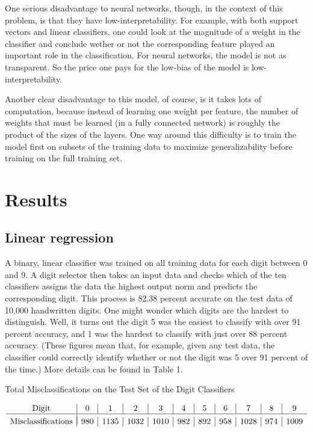 \documentclass{article}
\begin{document}
One serious disadvantage to neural networks, though, in the context of this problem, is that they have low-interpretability. For example, with both support vectors and linear classifiers, one could look at the magnitude of a weight in the classifier and conclude wether or not the corresponding feature played an important role in the classification. For neural networks, the model is not as transparent. So the price one pays for the low-bias of the model is low-interpretability. 

Another clear disadvantage to this model, of course, is it takes lots of computation, because instead of learning one weight per feature, the number of weights that must be learned (in a fully connected network) is roughly the product of the sizes of the layers. One way around this difficulty is to train the model first on subsets of the training data to maximize generalizability before training on the full training set.

\section{Results}

\subsection{Linear regression}

A binary, linear classifier was trained on all training data for each digit between 0 and 9. A digit selector then takes an input data and checks which of the ten classifiers assigns the data the highest output norm and predicts the corresponding digit. This process is 82.38 percent accurate on the test data of 10,000 handwritten digits. One might wonder which digits are the hardest to distinguish. Well, it turns out the digit 5 was the easiest to classify with over 91 percent accuracy, and 1 was the hardest to classify with just over 88 percent accuracy. (These figures mean that, for example, given any test data, the classifier could correctly identify whether or not the digit was 5 over 91 percent of the time.) More details can be found in Table 1. \begin{table}
  \caption{Total Misclassifications on the Test Set of the Digit Classifiers}
  \label{sample-table}
  \centering
  $$\begin{array}{c|c|c|c|c|c|c|c|c|c|c} \mbox{Digit} & 0 & 1 & 2 & 3 &4 & 5 & 6 & 7 & 8 & 9  \\ \hline  \\[-.3cm]
\mbox{Misclassifications} & 980 & 1135 & 1032 & 1010 & 982 & 892 & 958 & 1028 & 974 & 1009

\end{array}$$
\end{table}
\end{document}
